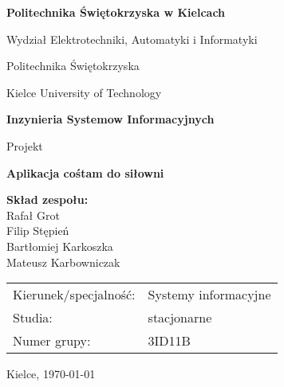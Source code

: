\documentclass[../../spr.tex]{subfiles}
\begin{document}
\begin{titlepage}
  \centering

  {\fontsize{16}{18}\selectfont \bfseries Politechnika Świętokrzyska w Kielcach}

  \vspace{0.5cm}
  Wydział Elektrotechniki, Automatyki i Informatyki

  \vspace{1.5cm}
  {\large Politechnika Świętokrzyska}

  \vspace{0.2cm}
  {\large Kielce University of Technology}

  \vfill

  {\LARGE \bfseries Inzynieria Systemow Informacyjnych}

  \vspace{1.5cm}
  {\Huge Projekt}

  \vfill

  {\Huge \bfseries Aplikacja cośtam do siłowni}

  \vfill

  \begin{flushleft}
    \begin{minipage}{0.5\textwidth}
      \large
      \textbf{Skład zespołu:} \\
      Rafał Grot \\
      Filip Stępień \\
      Bartłomiej Karkoszka \\
      Mateusz Karbowniczak
    \end{minipage}

    \vspace{2cm}

    \begin{minipage}{0.8\textwidth}
      \large
      \begin{tabular}{p{5cm}p{5cm}}
        Kierunek/specjalność: & Systemy informacyjne \\
        Studia:               & stacjonarne          \\
        Numer grupy:          & 3ID11B
      \end{tabular}
    \end{minipage}
  \end{flushleft}

  \vspace{1cm}

  \large Kielce, \today
\end{titlepage}
\end{document}

